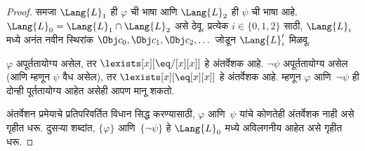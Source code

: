 \begin{proof}
समजा $\Lang{L}_1$ ही $\varphi$ ची भाषा आणि $\Lang{L}_2$ ही $\psi$ ची भाषा
आहे. $\Lang{L}_0 = \Lang{L}_1 \cap \Lang{L}_2$ असे ठेवू. प्रत्येक
$i \in \{0, 1, 2 \}$ साठी, $\Lang{L}_i$ मध्ये अनंत नवीन स्थिरांक
$\Obj c_0, \Obj c_1, \Obj c_2, \dots$ जोडून $\Lang{L}'_i$ मिळवू.

$\varphi$ अपूर्ततायोग्य असेल, तर $\lexists[x][\eq/[x][x]]$ हे अंतर्वेशक आहे.
$\lnot \psi$ अपूर्ततायोग्य असेल (आणि म्हणून $\psi$ वैध असेल), तर
$\lexists[x][\eq[x][x]]$ हे अंतर्वेशक आहे. म्हणून $\varphi$ आणि~$\lnot \psi$
ही दोन्ही पूर्ततायोग्य आहेत असेही आपण मानू शकतो.

अंतर्वेशन प्रमेयाचे प्रतिपरिवर्तित विधान सिद्ध करण्यासाठी, $\varphi$ आणि~$\psi$
यांचे कोणतेही अंतर्वेशक नाही असे गृहीत धरू. दुसऱ्या शब्दांत, $\{\varphi\}$
आणि~$\{\lnot \psi\}$ हे $\Lang{L}_0$ मध्ये अविलगनीय आहेत असे गृहीत धरू.


\end{proof}
